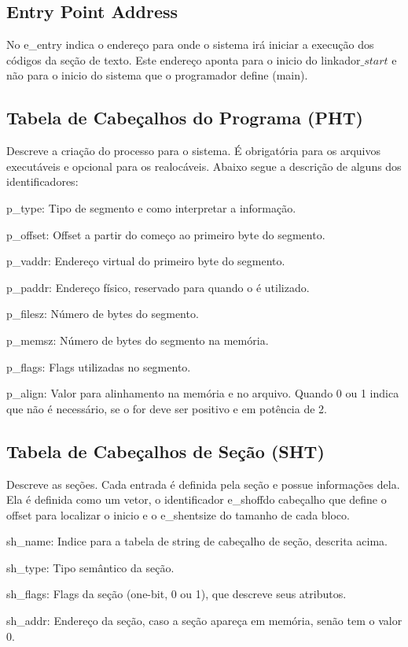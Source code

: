 \subsection {Entry Point Address}
  No e\_entry indica o endereço para onde o sistema irá iniciar a execução dos códigos da seção de texto. Este endereço aponta para o inicio do linkador\(\_start\) e não para o inicio do sistema que o programador define (main).

\subsection {Tabela de Cabeçalhos do Programa (PHT)}
   Descreve a criação do processo para o sistema. É obrigatória para os arquivos executáveis e opcional para os realocáveis. Abaixo segue a descrição de alguns dos identificadores:
   
   p\_type: Tipo de segmento e como interpretar a informação.

   p\_offset: Offset a partir do começo ao primeiro byte do segmento.

   p\_vaddr: Endereço virtual do primeiro byte do segmento.

   p\_paddr: Endereço físico, reservado para quando o é utilizado.

   p\_filesz: Número de bytes do segmento.

   p\_memsz: Número de bytes do segmento na memória.

   p\_flags: Flags utilizadas no segmento.

   p\_align: Valor para alinhamento na memória e no arquivo. Quando 0 ou 1 indica que não é necessário, se o for deve ser positivo e em potência de 2.

\subsection {Tabela de Cabeçalhos de Seção (SHT)}
   Descreve as seções. Cada entrada é definida pela seção e possue informações dela.
   Ela é definida como um vetor, o identificador e\_shoffdo cabeçalho que define o offset para localizar o inicio e o e\_shentsize do tamanho de cada bloco.
   
   sh\_name: Indice para a tabela de string de cabeçalho de seção, descrita acima.

   sh\_type: Tipo semântico da seção.

   sh\_flags: Flags da seção (one-bit, 0 ou 1), que descreve seus atributos.

   sh\_addr: Endereço da seção, caso a seção apareça em memória, senão tem o valor 0.


